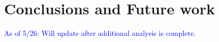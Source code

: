 %
%
%
%
%
%
%



\section{Conclusions and Future work}
\textcolor{blue}{As of 5/26: Will update after additional analysis is complete.}



